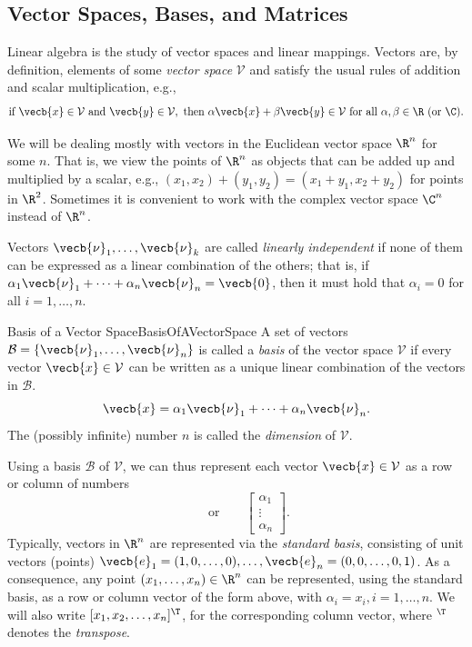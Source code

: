 \subsection{Vector Spaces, Bases, and Matrices}
Linear algebra is the study of vector spaces and linear mappings. Vectors are, by definition, elements of some \textit{vector space} $\mathcal{V}$ and satisfy the usual rules of addition and scalar multiplication, e.g.,
\[
	\text{if } \vecb{x} \in \mathcal{V} \text{ and } \vecb{y} \in \mathcal{V}, \text{ then } \alpha \vecb{x} + \beta \vecb{y} \in \mathcal{V} \text{ for all } \alpha, \beta \in \R \text{ (or } \C\text{)}.
\]

We will be dealing mostly with vectors in the Euclidean vector space $\R^n$ for some $n$. That is, we view the points of $\R^n$ as objects that can be added up and multiplied by a scalar, e.g., $(x_1, x_2) + (y_1, y_2) = (x_1 + y_1, x_2 + y_2)$ for points in $\R^2$. Sometimes it is convenient to work with the complex vector space $\C^n$ instead of $\R^n$.

Vectors $\vecb{\nu}_1, \dots, \vecb{\nu}_k$ are called \textit{linearly independent} if none of them can be expressed as a linear combination of the others; that is, if $\alpha_1 \vecb{\nu}_1 + \dots + \alpha_n \vecb{\nu}_n = \vecb{0}$, then it must hold that $\alpha_i = 0$ for all $i = 1, \dots, n$.

\begin{defn}{Basis of a Vector Space}{BasisOfAVectorSpace}
	A set of vectors $\mathcal{B} = \{\vecb{\nu}_1, \dots, \vecb{\nu}_n\}$ is called a \textit{basis} of the vector space $\mathcal{V}$ if every vector $\vecb{x} \in \mathcal{V}$ can be written as a unique linear combination of the vectors in $\mathcal{B}$.
	\begin{equation*}
		\vecb{x} = \alpha_1 \vecb{\nu}_1 + \dots + \alpha_n \vecb{\nu}_n.
	\end{equation*}
	The (possibly infinite) number $n$ is called the \textit{dimension} of $\mathcal{V}$.
\end{defn}
Using a basis $\mathcal{B}$ of $\mathcal{V}$, we can thus represent each vector $\vecb{x} \in \mathcal{V}$ as a row or column of numbers
\begin{equation}
	[\alpha_1, \dots, \alpha_n] \qquad \text{or} \qquad
	\begin{bmatrix}
		\alpha_1 \\ \vdots \\ \alpha_n
	\end{bmatrix}.
	\label{eq:VectorRep}
\end{equation}
Typically, vectors in $\R^n$ are represented via the \textit{standard basis}, consisting of unit vectors (points) $\vecb{e}_1 = (1, 0, \dots, 0), \dots, \vecb{e}_n = (0, 0, \dots, 0, 1)$. As a consequence, any point $(x_1, \dots, x_n) \in \R^n$ can be represented, using the standard basis, as a row or column vector of the form  above, with $\alpha_i = x_i, i = 1, \dots, n$. We will also write $[x_1, x_2, \dots, x_n]^\T$, for the corresponding column vector, where ${}^\T$ denotes the \textit{transpose}.

